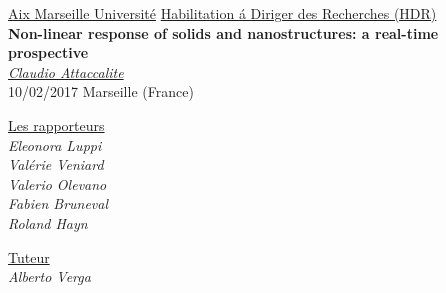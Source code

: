 \documentclass[12pt]{book}
\renewcommand{\baselinestretch}{1.3}
\newcommand{\clearemptydoublepage}{\newpage{\pagestyle{empty}\cleardoublepage}}
\renewcommand{\[}{\left[}
\renewcommand{\]}{\right]}
\renewcommand{\(}{\left(}
\renewcommand{\)}{\right)}
\renewcommand{\[}{\left[}
\renewcommand{\]}{\right]}
\renewcommand{\(}{\left(}
\renewcommand{\)}{\right)}
\begin{document}
\pagestyle{empty}

\begin{center}

\begin{figure}
\hspace{2cm}
\end{figure}
\vspace{-2cm}
\Large{\underline{Aix Marseille Universit\'e}}
\vspace{0.5cm}
\Large{\underline{Habilitation \'a Diriger des Recherches (HDR)}}\\
\vspace{1cm}
\LARGE{
{\bf Non-linear response of solids and nanostructures: a real-time prospective}}\\
\vspace{1cm}
\Large{\underline{\it Claudio Attaccalite}}\\[1cm]
\vspace{0.2cm}
    \Large{10/02/2017   Marseille (France)}\\[1cm]
\large{
\parbox[t]{7cm}{
 \begin{center}
     \underline{Les rapporteurs}\\
             {\it Eleonora Luppi}\\[0.2cm]
             {\it Valérie Veniard}\\[0.2cm]
             {\it Valerio Olevano}\\[0.2cm]
             {\it Fabien Bruneval}\\[0.2cm]
	     {\it Roland Hayn}\end{center}}
\hspace{.5cm}
\parbox[t]{7cm}{
 \begin{center}\underline{Tuteur}\\
	     {\it Alberto Verga}\end{center}}
}
\vspace{1.9cm}

\end{center}

\clearemptydoublepage


\pagestyle{plain}

\setcounter{tocdepth}{4}
\renewcommand{\baselinestretch}{1.5}
\tableofcontents
\clearemptydoublepage
%
\clearemptydoublepage



\clearemptydoublepage
\end{document}
